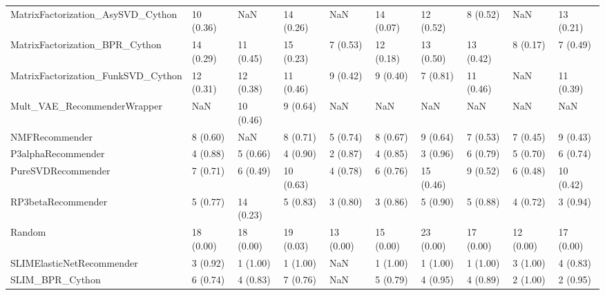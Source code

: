 \begin{tabular}{llllllllll}
  MatrixFactorization\_AsySVD\_Cython &                10 (0.36) &         NaN &     14 (0.26) &          NaN &            14 (0.07) &           12 (0.52) &          8 (0.52) &                NaN &         13 (0.21) \\
     MatrixFactorization\_BPR\_Cython &                14 (0.29) &   11 (0.45) &     15 (0.23) &     7 (0.53) &            12 (0.18) &           13 (0.50) &         13 (0.42) &           8 (0.17) &          7 (0.49) \\
 MatrixFactorization\_FunkSVD\_Cython &                12 (0.31) &   12 (0.38) &     11 (0.46) &     9 (0.42) &             9 (0.40) &            7 (0.81) &         11 (0.46) &                NaN &         11 (0.39) \\
        Mult\_VAE\_RecommenderWrapper &                      NaN &   10 (0.46) &      9 (0.64) &          NaN &                  NaN &                 NaN &               NaN &                NaN &               NaN \\
                     NMFRecommender &                 8 (0.60) &         NaN &      8 (0.71) &     5 (0.74) &             8 (0.67) &            9 (0.64) &          7 (0.53) &           7 (0.45) &          9 (0.43) \\
                 P3alphaRecommender &                 4 (0.88) &    5 (0.66) &      4 (0.90) &     2 (0.87) &             4 (0.85) &            3 (0.96) &          6 (0.79) &           5 (0.70) &          6 (0.74) \\
                 PureSVDRecommender &                 7 (0.71) &    6 (0.49) &     10 (0.63) &     4 (0.78) &             6 (0.76) &           15 (0.46) &          9 (0.52) &           6 (0.48) &         10 (0.42) \\
                 RP3betaRecommender &                 5 (0.77) &   14 (0.23) &      5 (0.83) &     3 (0.80) &             3 (0.86) &            5 (0.90) &          5 (0.88) &           4 (0.72) &          3 (0.94) \\
                             Random &                18 (0.00) &   18 (0.00) &     19 (0.03) &    13 (0.00) &            15 (0.00) &           23 (0.00) &         17 (0.00) &          12 (0.00) &         17 (0.00) \\
          SLIMElasticNetRecommender &                 3 (0.92) &    1 (1.00) &      1 (1.00) &          NaN &             1 (1.00) &            1 (1.00) &          1 (1.00) &           3 (1.00) &          4 (0.83) \\
                    SLIM\_BPR\_Cython &                 6 (0.74) &    4 (0.83) &      7 (0.76) &          NaN &             5 (0.79) &            4 (0.95) &          4 (0.89) &           2 (1.00) &          2 (0.95) \\

\end{tabular}
